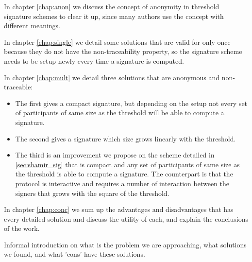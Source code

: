 In chapter \ref{chap:anon} we discuss the concept of anonymity in threshold signature schemes to clear it up, since many authors use the concept with different meanings.

In chapter \ref{chap:single} we detail some solutions that are valid for only once because they do not have the non-traceability property, so the signature scheme needs to be setup newly every time a signature is computed.

In chapter \ref{chap:mult} we detail three solutions that are anonymous and non-traceable:
\begin{itemize}[align = left, leftmargin=*, label={--}]
\item The first gives a compact signature, but depending on the setup not every set of participants of same size as the threshold will be able to compute a signature.
\item The second gives a signature which size grows linearly with the threshold.
\item The third is an improvement we propose on the scheme detailed in \ref{sec:shamir_sig} that is compact and any set of participants of same size as the threshold is able to compute a signature. The counterpart is that the protocol is interactive and requires a number of interaction between the signers that grows with the square of the threshold.
\end{itemize}

In chapter \ref{chap:conc} we sum up the advantages and disadvantages that has every detailed solution and discuss the utility of each, and explain the conclusions of the work.







Informal introduction on what is the problem we are approaching, what solutions we found, and what 'cons' have these solutions.
